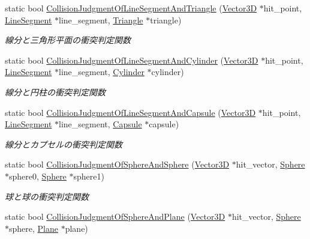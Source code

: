 \begin{DoxyCompactItemize}
static bool \mbox{\hyperlink{class_collision_calculation_ad74624614e9fefd55132f6a6cd62f05c}{Collision\+Judgment\+Of\+Line\+Segment\+And\+Triangle}} (\mbox{\hyperlink{class_vector3_d}{Vector3D}} $\ast$hit\+\_\+point, \mbox{\hyperlink{class_line_segment}{Line\+Segment}} $\ast$line\+\_\+segment, \mbox{\hyperlink{class_triangle}{Triangle}} $\ast$triangle)
\begin{DoxyCompactList}\small\item\em 線分と三角形平面の衝突判定関数 \end{DoxyCompactList}\item 
static bool \mbox{\hyperlink{class_collision_calculation_abfed92b06d3d7dbfc8289225328b9ad3}{Collision\+Judgment\+Of\+Line\+Segment\+And\+Cylinder}} (\mbox{\hyperlink{class_vector3_d}{Vector3D}} $\ast$hit\+\_\+point, \mbox{\hyperlink{class_line_segment}{Line\+Segment}} $\ast$line\+\_\+segment, \mbox{\hyperlink{class_cylinder}{Cylinder}} $\ast$cylinder)
\begin{DoxyCompactList}\small\item\em 線分と円柱の衝突判定関数 \end{DoxyCompactList}\item 
static bool \mbox{\hyperlink{class_collision_calculation_a6fc9b23bb92d4fca01d1812669f333ed}{Collision\+Judgment\+Of\+Line\+Segment\+And\+Capsule}} (\mbox{\hyperlink{class_vector3_d}{Vector3D}} $\ast$hit\+\_\+point, \mbox{\hyperlink{class_line_segment}{Line\+Segment}} $\ast$line\+\_\+segment, \mbox{\hyperlink{class_capsule}{Capsule}} $\ast$capsule)
\begin{DoxyCompactList}\small\item\em 線分とカプセルの衝突判定関数 \end{DoxyCompactList}\item 
static bool \mbox{\hyperlink{class_collision_calculation_a23a849e4b29bc0d87356d2b3272469b0}{Collision\+Judgment\+Of\+Sphere\+And\+Sphere}} (\mbox{\hyperlink{class_vector3_d}{Vector3D}} $\ast$hit\+\_\+vector, \mbox{\hyperlink{class_sphere}{Sphere}} $\ast$sphere0, \mbox{\hyperlink{class_sphere}{Sphere}} $\ast$sphere1)
\begin{DoxyCompactList}\small\item\em 球と球の衝突判定関数 \end{DoxyCompactList}\item 
static bool \mbox{\hyperlink{class_collision_calculation_a776c3b2ee6ece38b29914dd69f63ed42}{Collision\+Judgment\+Of\+Sphere\+And\+Plane}} (\mbox{\hyperlink{class_vector3_d}{Vector3D}} $\ast$hit\+\_\+vector, \mbox{\hyperlink{class_sphere}{Sphere}} $\ast$sphere, \mbox{\hyperlink{class_plane}{Plane}} $\ast$plane)

\end{DoxyCompactItemize}
